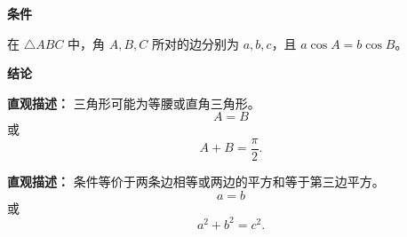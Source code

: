 \begin{statementbox}
	\textbf{\textcolor{CStatement}{条件}}
	\begin{description}[style=nextline, leftmargin=2.8em, labelsep=0.5em, itemsep=0.35em]
		\item[\textbf{\textcolor{CStatement}{条件 1（边角等式）：}}] 在 $\triangle ABC$ 中，角 $A, B, C$ 所对的边分别为 $a, b, c$，且 $a\cos A = b\cos B$。
	\end{description}

	\textbf{\textcolor{CStatement}{结论}}
	\begin{description}[style=nextline, leftmargin=2.8em, labelsep=0.5em, itemsep=0.45em]
		\item[\textbf{\textcolor{CStatement}{结论一（形状判定）：}}]
			\textbf{\textcolor{CStatement}{直观描述：}}
			三角形可能为等腰或直角三角形。
			\[
				A = B
			\]
			或
			\[
				A + B = \frac{\pi}{2}.
			\]

		\item[\textbf{\textcolor{CStatement}{推广结论（等价边关系）：}}]
			\textbf{\textcolor{CStatement}{直观描述：}}
			条件等价于两条边相等或两边的平方和等于第三边平方。
			\[
				a = b
			\]
			或
			\[
				a^{2} + b^{2} = c^{2}.
			\]
	\end{description}
\end{statementbox}
